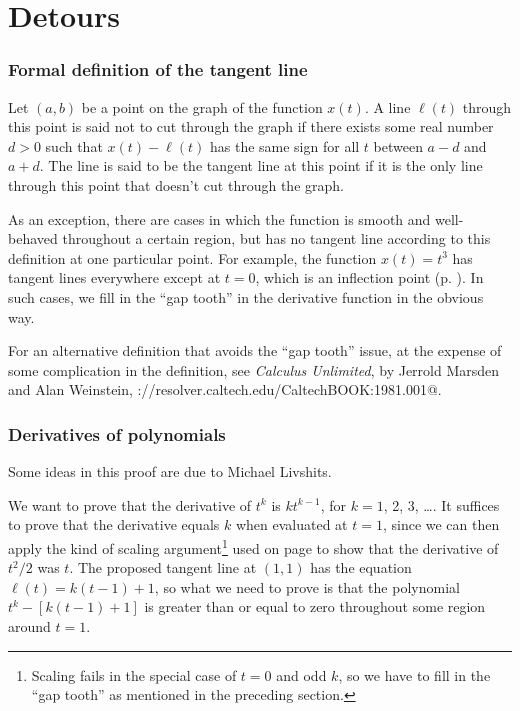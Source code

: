 \chapter{Detours}

\newcommand{\detour}[2]{\subsection{#2}\label{detour:#1}}

\vfill

\detour{def-tangent}{Formal definition of the tangent line}

Let $(a,b)$ be a point on the graph of the function $x(t)$.
A line $\ell(t)$ through this point is said not to cut through the graph
if there exists some real number $d>0$ such that
$x(t)-\ell(t)$ has the same sign for all $t$ between $a-d$ and $a+d$.
The line is said to be the tangent line at this point if it is the
only line through this point that doesn't cut through the graph.

As an exception,
there are cases in which the function is smooth and well-behaved throughout a certain
region, but has no tangent line according to this definition at one particular point.
For example, the function $x(t)=t^3$ has tangent lines everywhere except at $t=0$,
which is an inflection point (p. \pageref{inflection}). In such cases, we fill in the
``gap tooth'' in the derivative function in the obvious way.

For an alternative definition that avoids the ``gap tooth'' issue, at the expense
of some complication in the definition, see \emph{Calculus Unlimited}, by Jerrold
Marsden and Alan Weinstein, \verb@http://resolver.caltech.edu/CaltechBOOK:1981.001@.

\pagebreak

\detour{polynomial-proof}{Derivatives of polynomials}

Some ideas in this proof are due to Michael Livshits.

We want to prove that the derivative of $t^k$ is $kt^{k-1}$, for $k=1$, 2, 3, \ldots. It suffices to
prove that the derivative equals $k$ when evaluated at $t=1$, since we can
then apply the kind of scaling argument\footnote{Scaling fails in the special case of $t=0$ and odd $k$,
so we have to fill in the ``gap tooth''
as mentioned in the preceding section.} used on page \pageref{scaling} to
show that the derivative of $t^2/2$ was $t$. The proposed tangent line at $(1,1)$
has the equation $\ell(t)=k(t-1)+1$, so what we need to prove is that
the polynomial $t^k-[k(t-1)+1]$ is greater than or equal to zero throughout some
region around $t=1$.

